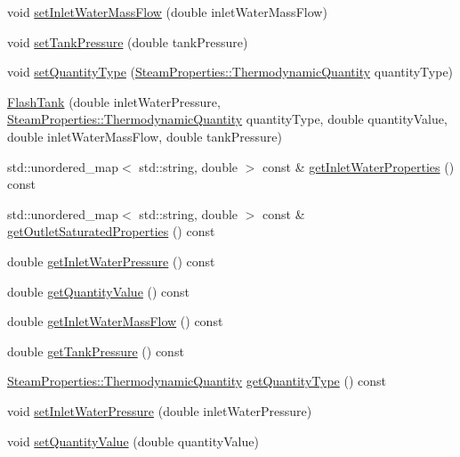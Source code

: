 \begin{DoxyCompactItemize}
\item 
void \hyperlink{class_flash_tank_a2bcbd92d39ef3c760bdd65066ba3d34a}{set\+Inlet\+Water\+Mass\+Flow} (double inlet\+Water\+Mass\+Flow)
\item 
void \hyperlink{class_flash_tank_a8b3bb51a62dac4f76284dfdc114d83fe}{set\+Tank\+Pressure} (double tank\+Pressure)
\item 
void \hyperlink{class_flash_tank_a30aa7a42d1547f61b176da4a15e8e8ee}{set\+Quantity\+Type} (\hyperlink{class_steam_properties_ae0294bedf7d178c2d8fb6aed0f62fbff}{Steam\+Properties\+::\+Thermodynamic\+Quantity} quantity\+Type)
\item 
\hyperlink{class_flash_tank_ad576e26508da35738127a65fd6ddc35d}{Flash\+Tank} (double inlet\+Water\+Pressure, \hyperlink{class_steam_properties_ae0294bedf7d178c2d8fb6aed0f62fbff}{Steam\+Properties\+::\+Thermodynamic\+Quantity} quantity\+Type, double quantity\+Value, double inlet\+Water\+Mass\+Flow, double tank\+Pressure)
\item 
std\+::unordered\+\_\+map$<$ std\+::string, double $>$ const  \& \hyperlink{class_flash_tank_a57a316e4ef448f4a9447b675ba6ac84b}{get\+Inlet\+Water\+Properties} () const
\item 
std\+::unordered\+\_\+map$<$ std\+::string, double $>$ const  \& \hyperlink{class_flash_tank_aa22fdef56a1ad6d70beda66cc8a6940a}{get\+Outlet\+Saturated\+Properties} () const
\item 
double \hyperlink{class_flash_tank_a62e8ff97d91da0845526c494022e41da}{get\+Inlet\+Water\+Pressure} () const
\item 
double \hyperlink{class_flash_tank_ab2145598969881df58736a1b65326d17}{get\+Quantity\+Value} () const
\item 
double \hyperlink{class_flash_tank_a2b6dcd9e175a9f2fc550ea91006aa66a}{get\+Inlet\+Water\+Mass\+Flow} () const
\item 
double \hyperlink{class_flash_tank_af5d4f0bf7babe61120e1e4452594e1af}{get\+Tank\+Pressure} () const
\item 
\hyperlink{class_steam_properties_ae0294bedf7d178c2d8fb6aed0f62fbff}{Steam\+Properties\+::\+Thermodynamic\+Quantity} \hyperlink{class_flash_tank_a1800317a9b9dd8ff8fb18c693e846a45}{get\+Quantity\+Type} () const
\item 
void \hyperlink{class_flash_tank_aed0991a7902401d110fb2f4b472326f5}{set\+Inlet\+Water\+Pressure} (double inlet\+Water\+Pressure)
\item 
void \hyperlink{class_flash_tank_ac7392743aeaf8de6ce368814ea42e236}{set\+Quantity\+Value} (double quantity\+Value)

\end{DoxyCompactItemize}

